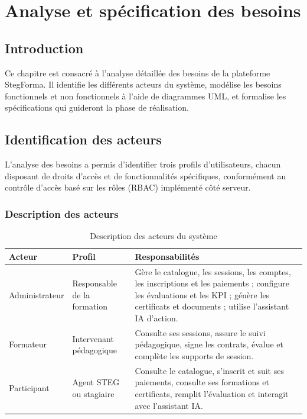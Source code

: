 \documentclass[12pt,a4paper,oneside,openany]{report}
\begin{document}
\chapter[Analyse et spécification des besoins]{Analyse et spécification des besoins}

\section*{Introduction}
\hrulefill

Ce chapitre est consacré à l'analyse détaillée des besoins de la plateforme StegForma. Il identifie les différents acteurs du système, modélise les besoins fonctionnels et non fonctionnels à l'aide de diagrammes UML, et formalise les spécifications qui guideront la phase de réalisation.

\section{Identification des acteurs}

L'analyse des besoins a permis d'identifier trois profils d'utilisateurs, chacun disposant de droits d'accès et de fonctionnalités spécifiques, conformément au contrôle d'accès basé sur les rôles (RBAC) implémenté côté serveur.

\subsection{Description des acteurs}

\begin{table}[H]
\centering
\caption{Description des acteurs du système}
\begin{tabular}{|p{2.6cm}|p{3.6cm}|p{6.2cm}|}
\hline
\textbf{Acteur} & \textbf{Profil} & \textbf{Responsabilités} \\
\hline
Administrateur & Responsable de la formation & Gère le catalogue, les sessions, les comptes, les inscriptions et les paiements ; configure les évaluations et les KPI ; génère les certificats et documents ; utilise l'assistant IA d'action. \\
\hline
Formateur & Intervenant pédagogique & Consulte ses sessions, assure le suivi pédagogique, signe les contrats, évalue et complète les supports de session. \\
\hline
Participant & Agent STEG ou stagiaire & Consulte le catalogue, s'inscrit et suit ses paiements, consulte ses formations et certificats, remplit l'évaluation et interagit avec l'assistant IA. \\
\hline
\end{tabular}
\end{table}
\end{document}
